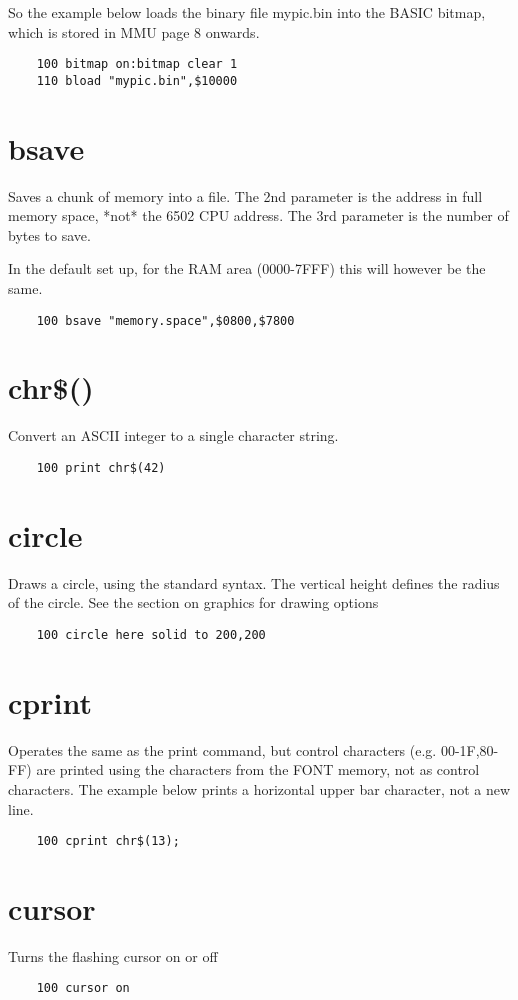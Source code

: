 So the example below loads the binary file mypic.bin into the BASIC bitmap, which is stored in MMU page 8 onwards.
\example{}
\begin{verbatim}
	100 bitmap on:bitmap clear 1
	110 bload "mypic.bin",$10000
\end{verbatim}

\section*{bsave}
Saves a chunk of memory into a file. The 2nd parameter is the address in full memory space, *not* the 6502 CPU address. The 3rd parameter is the number of bytes to save.

In the default set up, for the RAM area (0000-7FFF) this will however be the same.

\example{}
\begin{verbatim}
	100 bsave "memory.space",$0800,$7800
\end{verbatim}

\section*{chr\$()}
Convert an ASCII integer to a single character string.
\example{}
\begin{verbatim}
	100 print chr$(42)
\end{verbatim}

\section*{circle}
Draws a circle, using the standard syntax. The vertical height defines the radius of the circle. See the section on graphics for drawing options
\example{}
\begin{verbatim}
	100 circle here solid to 200,200
\end{verbatim}

\section*{cprint}
Operates the same as the print command, but control characters (e.g. 00-1F,80-FF) are printed using the characters from the FONT memory, not as control characters. The example below prints a horizontal upper bar character, not a new line.
\example{}
\begin{verbatim}
	100 cprint chr$(13);
\end{verbatim}

\section*{cursor}
Turns the flashing cursor on or off
\example{}
\begin{verbatim}
	100 cursor on
\end{verbatim}

